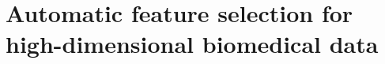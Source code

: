 \documentclass[10pt,a4paper]{report}
\newcommand{\documenttitle}{A computational biology framework}
\newcommand{\documentsubtitle}{A data analysis tool to support biomedical engineers in their research}
\begin{document}
	
%		
%		
%		
%		
%		
%		
%		
%		
%		
%				
%		
%		
%		
%		
%		
	
	
	
	\pagestyle{fancy}
	\fancyhead{} %
	\fancyfoot{} %
	\renewcommand{\headrulewidth}{0.4pt}
	\renewcommand{\footrulewidth}{0.4pt}
	
	\fancyhead[L]{\rightmark}
	\fancyfoot[C]{\thepage}
	
	
	\clearpage
	
	\chapter{Automatic feature selection for high-dimensional biomedical data}
	\label{chap:FeatureSelection}
	
\end{document}
